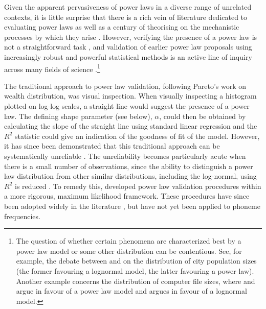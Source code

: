 Given the apparent pervasiveness of power laws in a diverse range of unrelated contexts, it is little surprise that there is a rich vein of literature dedicated to evaluating power laws \autocite[p.~662]{clauset_power-law_2009} as well as a century of theorising on the mechanistic processes by which they arise \autocites[see][pp.~336--348]{newman_power_2005}[pp.~230--243]{mitzenmacher_brief_2004}. However, verifying the presence of a power law is not a straightforward task \autocite[p.~666]{stumpf_critical_2012}, and validation of earlier power law proposals using increasingly robust and powerful statistical methods is an active line of inquiry across many fields of science \autocite{malevergne_testing_2011}.\footnote{The question of whether certain phenomena are characterized best by a power law model or some other distribution can be contentious. See, for example, the debate between \textcite{eeckhout_gibrats_2004} and \textcite{levy_gibrats_2009} on the distribution of city population sizes (the former favouring a lognormal model, the latter favouring a power law). Another example concerns the distribution of computer file sizes, where \textcite{barford_generating_1998} and \textcite{barford_changes_1999} argue in favour of a power law model and \textcite{downey_structural_2001} argues in favour of a lognormal model.}

The traditional approach to power law validation, following Pareto's \autocite*{pareto_cours_1897} work on wealth distribution, was visual inspection. When visually inspecting a histogram plotted on log-log scales, a straight line would suggest the presence of a power law. The defining shape parameter (see below), \(\alpha\), could then be obtained by calculating the slope of the straight line using standard linear regression \autocites[p.~665]{clauset_power-law_2009}[p.~254]{urzua_testing_2011} and the \(R^2\) statistic could give an indication of the goodness of fit of the model. However, it has since been demonstrated that this traditional approach can be systematically unreliable \autocite[p.~665]{clauset_power-law_2009}. The unreliability becomes particularly acute when there is a small number of observations, since the ability to distinguish a power law distribution from other similar distributions, including the log-normal, using \(R^2\) is reduced \autocite[p.~691]{clauset_power-law_2009}. To remedy this, \textcite{clauset_power-law_2009} developed power law validation procedures within a more rigorous, maximum likelihood framework. These procedures have since been adopted widely in the literature \autocites[for example,][]{touboul_can_2010}{cho_friendship_2011}{brzezinski_power_2014}[and][]{lee_change_2018}, but have not yet been applied to phoneme frequencies.


